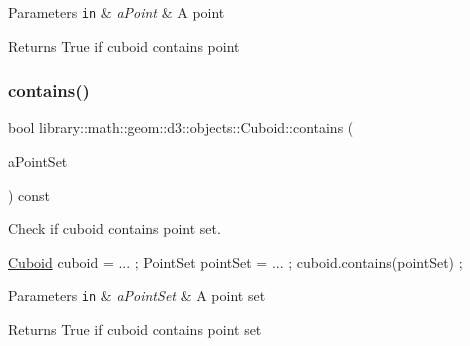 \begin{DoxyParams}[1]{Parameters}
\mbox{\tt in}  & {\em a\+Point} & A point \\
\hline
\end{DoxyParams}
\begin{DoxyReturn}{Returns}
True if cuboid contains point 
\end{DoxyReturn}
\mbox{\label{classlibrary_1_1math_1_1geom_1_1d3_1_1objects_1_1_cuboid_a7113ad052aa87e7ac691481ceaa6e452}} 
\subsubsection{\texorpdfstring{contains()}{contains()}\hspace{0.1cm}{\footnotesize\ttfamily [2/3]}}
{\footnotesize\ttfamily bool library\+::math\+::geom\+::d3\+::objects\+::\+Cuboid\+::contains (\begin{DoxyParamCaption}\item[{const \hyperlink{classlibrary_1_1math_1_1geom_1_1d3_1_1objects_1_1_point_set}{Point\+Set} \&}]{a\+Point\+Set }\end{DoxyParamCaption}) const}



Check if cuboid contains point set. 


\begin{DoxyCode}
\hyperlink{classlibrary_1_1math_1_1geom_1_1d3_1_1objects_1_1_cuboid_ac42299f962fab284a76a46d4ea4e6fa2}{Cuboid} cuboid = ... ;
PointSet pointSet = ... ;
cuboid.contains(pointSet) ;
\end{DoxyCode}



\begin{DoxyParams}[1]{Parameters}
\mbox{\tt in}  & {\em a\+Point\+Set} & A point set \\
\hline
\end{DoxyParams}
\begin{DoxyReturn}{Returns}
True if cuboid contains point set 
\end{DoxyReturn}
\mbox{\label{classlibrary_1_1math_1_1geom_1_1d3_1_1objects_1_1_cuboid_a91907355c70e38c1877fd2c1ad4c8dba}} 
